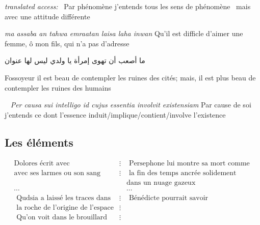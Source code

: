 \documentclass{article}
\begin{document}
												\emph{translated access:}  Par phénomène j’entends tous les sens de phénomène  mais avec une attitude différente  					                        
                        														
                             \emph{ ma assaba an tahwa emraatan laisa laha inwan} Qu'il est difficle d'aimer une femme, ô mon fils, qui n'a pas d'adresse
                              
                      \begin{center}

                                                             \begin{otherlanguage}{arabic}

          ما أصعب أن تهوى إمرأة يا ولدي ليس لها عنوان                                 
               
                                    \end{otherlanguage}             

\end{center}
                        Fossoyeur il est beau de contempler les ruines des cités; mais, il est  plus beau de contempler les ruines des humains
                                          
                                                                                                 \emph{Per causa sui intelligo id cujus essentia involvit existensiam}
                                                                                               Par cause de soi j'entends ce dont l'essence induit/implique/contient/involve l'existence   
               
    
 \subsection{ Les éléments}
 \[
 \begin{matrix}
 \text{Dolores écrit avec}   &  \vdots&     \text{ Persephone lui montre sa mort comme } \\
 \text{avec ses larmes ou son  sang} &\vdots&\text{  la fin des temps ancrée solidement}\\
 &&\text{dans un nuage gazeux} \\
 \cdots & &\cdots \\
  \text{ Qudsia a laissé les traces dans} &\vdots & \text{ Bénédicte pourrait savoir }\\
  \text{ la roche de l'origine de l'espace} &\vdots&     \\
  \text{ Qu'on voit dans le brouillard} &\vdots&     \\
    \end{matrix} \]
 
\end{document}
